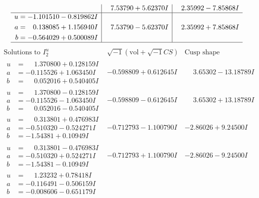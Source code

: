 \documentclass[1p]{elsarticle_modified}
\theoremstyle{definition}
\newcommand{\I}{\sqrt{-1}}
\begin{document}
$$\begin{array}{c|c|c}
 & \phantom{-}7.53790 + 5.62370 I & \phantom{-}2.35992 - 7.85868 I \\ \hline\begin{aligned}
u &= -1.101510 - 0.819862 I \\
a &= \phantom{-}0.138085 + 1.156940 I \\
b &= -0.564029 + 0.500089 I\end{aligned}
 & \phantom{-}7.53790 - 5.62370 I & \phantom{-}2.35992 + 7.85868 I\\
 \hline 
 \end{array}$$\newpage$$\begin{array}{c|c|c}  
\text{Solutions to }I^u_{2}& \I (\text{vol} + \sqrt{-1}CS) & \text{Cusp shape}\\
 \hline 
\begin{aligned}
u &= \phantom{-}1.370800 + 0.128159 I \\
a &= -0.115526 + 1.063450 I \\
b &= \phantom{-}0.052016 + 0.540405 I\end{aligned}
 & -0.598809 + 0.612645 I & \phantom{-}3.65302 - 13.18789 I \\ \hline\begin{aligned}
u &= \phantom{-}1.370800 - 0.128159 I \\
a &= -0.115526 - 1.063450 I \\
b &= \phantom{-}0.052016 - 0.540405 I\end{aligned}
 & -0.598809 - 0.612645 I & \phantom{-}3.65302 + 13.18789 I \\ \hline\begin{aligned}
u &= \phantom{-}0.313801 + 0.476983 I \\
a &= -0.510320 - 0.524271 I \\
b &= -1.54381 + 0.10949 I\end{aligned}
 & -0.712793 - 1.100790 I & -2.86026 + 9.24500 I \\ \hline\begin{aligned}
u &= \phantom{-}0.313801 - 0.476983 I \\
a &= -0.510320 + 0.524271 I \\
b &= -1.54381 - 0.10949 I\end{aligned}
 & -0.712793 + 1.100790 I & -2.86026 - 9.24500 I \\ \hline\begin{aligned}
u &= \phantom{-}1.23232 + 0.78418 I \\
a &= -0.116491 - 0.506159 I \\
b &= -0.008606 - 0.651179 I\end{aligned}

\end{array}$$
\end{document}
